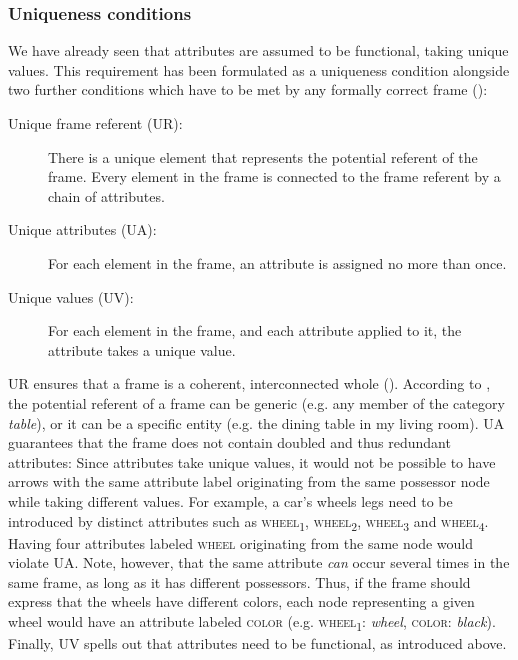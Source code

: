 \subsubsection{Uniqueness conditions}\label{sec:fr-dus-basic-unique}\largerpage

We have already seen that attributes are assumed to be functional, taking unique values. This requirement has been formulated as a uniqueness condition alongside two further conditions which have to be met by any formally correct frame (\citealt[307]{Loebner.2013}):

\begin{description}
	\item[Unique frame referent (UR):] There is a unique element that represents the potential referent of the frame. Every element in the frame is connected to the frame referent by a chain of attributes.
	\item[Unique attributes (UA):] For each element in the frame, an attribute is assigned no more than once.
	\item[Unique values (UV):] For each element in the frame, and each attribute applied to it, the attribute takes a unique value.
\end{description}
UR ensures that a frame is a coherent, interconnected whole (\citealt[27]{Loebner.2014a}). According to \citet[306]{Loebner.2013}, the potential referent of a frame can be generic (e.g. any member of the category \textit{table}), or it can be a specific entity (e.g. the dining table in my living room). 
UA guarantees that the frame does not contain doubled and thus redundant attributes: Since attributes take unique values, it would not be possible to have arrows with the same attribute label originating from the same possessor node while taking different values. For example, a car's wheels legs need to be introduced by distinct attributes such as \textsc{wheel}\textsubscript{1}, \textsc{wheel}\textsubscript{2}, \textsc{wheel}\textsubscript{3} and \textsc{wheel}\textsubscript{4}. Having four attributes labeled \textsc{wheel} originating from the same node would violate UA.
Note, however, that the same attribute \textit{can} occur several times in the same frame, as long as it has different possessors. Thus, if the frame should express that the wheels have different colors, each node representing a given wheel would have an attribute labeled \textsc{color} (e.g. \textsc{wheel}\textsubscript{1}: \textit{wheel}, \textsc{color:} \textit{black}).    
Finally, UV spells out that attributes need to be functional, as introduced above. 

